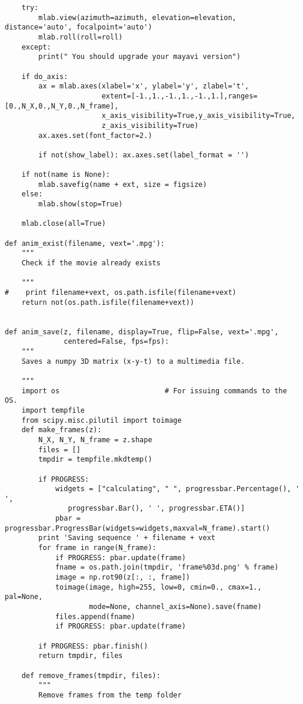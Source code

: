 \documentclass[a4paper,11pt]{article}%
\begin{document}
\begin{lstlisting}
    try:
        mlab.view(azimuth=azimuth, elevation=elevation, distance='auto', focalpoint='auto')
        mlab.roll(roll=roll)
    except:
        print(" You should upgrade your mayavi version")

    if do_axis:
        ax = mlab.axes(xlabel='x', ylabel='y', zlabel='t', 
                       extent=[-1.,1.,-1.,1.,-1.,1.],ranges=[0.,N_X,0.,N_Y,0.,N_frame],
                       x_axis_visibility=True,y_axis_visibility=True,
                       z_axis_visibility=True)
        ax.axes.set(font_factor=2.)

        if not(show_label): ax.axes.set(label_format = '')

    if not(name is None):
        mlab.savefig(name + ext, size = figsize)
    else:
        mlab.show(stop=True)

    mlab.close(all=True)

def anim_exist(filename, vext='.mpg'):
    """
    Check if the movie already exists

    """
#    print filename+vext, os.path.isfile(filename+vext)
    return not(os.path.isfile(filename+vext))


def anim_save(z, filename, display=True, flip=False, vext='.mpg', 
              centered=False, fps=fps):
    """
    Saves a numpy 3D matrix (x-y-t) to a multimedia file.

    """
    import os                         # For issuing commands to the OS.
    import tempfile
    from scipy.misc.pilutil import toimage
    def make_frames(z):
        N_X, N_Y, N_frame = z.shape
        files = []
        tmpdir = tempfile.mkdtemp()

        if PROGRESS:
            widgets = ["calculating", " ", progressbar.Percentage(), ' ',
               progressbar.Bar(), ' ', progressbar.ETA()]
            pbar = progressbar.ProgressBar(widgets=widgets,maxval=N_frame).start()
        print 'Saving sequence ' + filename + vext
        for frame in range(N_frame):
            if PROGRESS: pbar.update(frame)
            fname = os.path.join(tmpdir, 'frame%03d.png' % frame)
            image = np.rot90(z[:, :, frame])
            toimage(image, high=255, low=0, cmin=0., cmax=1., pal=None, 
                    mode=None, channel_axis=None).save(fname)
            files.append(fname)
            if PROGRESS: pbar.update(frame)

        if PROGRESS: pbar.finish()
        return tmpdir, files

    def remove_frames(tmpdir, files):
        """
        Remove frames from the temp folder
        

\end{lstlisting}
\end{document}
